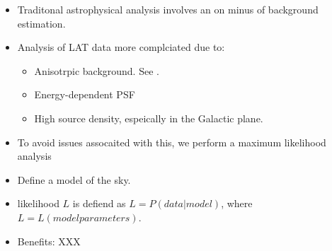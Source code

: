 
\begin{itemize}
  \item Traditonal astrophysical analysis involves an on minus of background estimation.
  \item Analysis of LAT data more complciated due to:
    \begin{itemize}
      \item Anisotrpic background. See .
      \item Energy-dependent PSF
      \item High source density, espeically in the Galactic plane.
    \end{itemize}
  \item To avoid issues assocaited with this, we perform a maximum likelihood analysis
  \item Define a model of the sky.
  \item likelihood $L$ is defiend as $L=P(data|model)$, where $L=L(model parameters)$.
  \item Benefits: XXX
\end{itemize}
